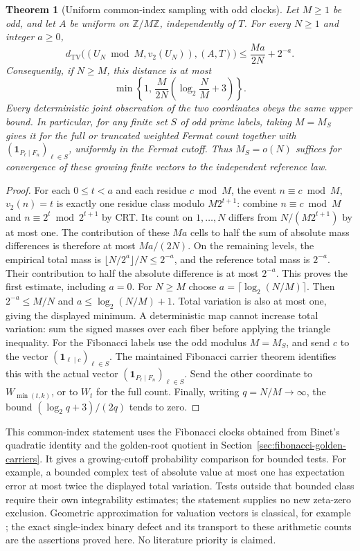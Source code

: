 \documentclass[11pt]{article}
\newtheorem{theorem}{Theorem}[section]
\theoremstyle{definition}
\begin{document}
\begin{theorem}[Uniform common-index sampling with odd clocks]
\label{thm:binary-odd-joint-sampling}
Let $M\ge1$ be odd, and let $A$ be uniform on
$\mathbb Z/M\mathbb Z$, independently of $T$.
For every $N\ge1$ and integer $a\ge0$,
\[
 d_{\mathrm{TV}}\bigl((U_N\bmod M,v_2(U_N)),(A,T)\bigr)
 \le \frac{Ma}{2N}+2^{-a}.
\]
Consequently, if $N\ge M$, this distance is at most
\[
 \min\left\{1,\,
 \frac{M}{2N}\left(\log_2\frac NM+3\right)\right\}.
\]
Every deterministic joint observation of the two coordinates obeys
the same upper bound.  In particular, for any finite set $S$ of odd
prime labels, taking $M=M_S$ gives it for the full or truncated
weighted Fermat count together with
$(\boldsymbol1_{P_\ell\mid F_n})_{\ell\in S}$,
uniformly in the Fermat cutoff.
Thus $M_S=o(N)$ suffices for convergence of these growing finite
vectors to the independent reference law.
\end{theorem}

\begin{proof}
For each $0\le t<a$ and each residue $c\bmod M$,
the event $n\equiv c\bmod M$, $v_2(n)=t$ is exactly one
residue class modulo $M2^{t+1}$: combine $n\equiv c\bmod M$
and $n\equiv2^t\bmod2^{t+1}$ by CRT.
Its count on $1,\ldots,N$ differs from
$N/(M2^{t+1})$ by at most one.
The contribution of these $Ma$ cells to half the sum of
absolute mass differences is therefore at most $Ma/(2N)$.
On the remaining levels, the empirical total mass is
$\lfloor N/2^a\rfloor/N\le2^{-a}$, and the reference total
mass is $2^{-a}$.  Their contribution to half the absolute
difference is at most $2^{-a}$.  This proves the first estimate,
including $a=0$.
For $N\ge M$ choose $a=\lceil\log_2(N/M)\rceil$.
Then $2^{-a}\le M/N$ and $a\le\log_2(N/M)+1$.
Total variation is also at most one, giving the displayed minimum.
A deterministic map cannot increase total variation: sum the
signed masses over each fiber before applying the triangle
inequality.  For the Fibonacci labels use the odd modulus
$M=M_S$, and send $c$ to the vector
$(\boldsymbol1_{\ell\mid c})_{\ell\in S}$.
The maintained Fibonacci carrier theorem identifies this with
the actual vector $(\boldsymbol1_{P_\ell\mid F_n})_{\ell\in S}$.
Send the other coordinate to $W_{\min(t,k)}$, or to $W_t$
for the full count.  Finally, writing $q=N/M\to\infty$,
the bound $(\log_2q+3)/(2q)$ tends to zero.
\end{proof}

This common-index statement uses the Fibonacci clocks obtained from
Binet's quadratic identity and the golden-root quotient in
Section~\ref{sec:fibonacci-golden-carriers}.
It gives a growing-cutoff probability comparison for bounded tests.
For example, a bounded complex test of absolute value at most one has
expectation error at most twice the displayed total variation.
Tests outside that bounded class require their own integrability
estimates; the statement supplies no new zeta-zero exclusion.
Geometric approximation for valuation vectors is classical, for
example \cite[Proposition~1.9]{TaoCollatz}; the exact single-index
binary defect and its transport to these arithmetic counts are
the assertions proved here.  No literature priority is claimed.
\end{document}
